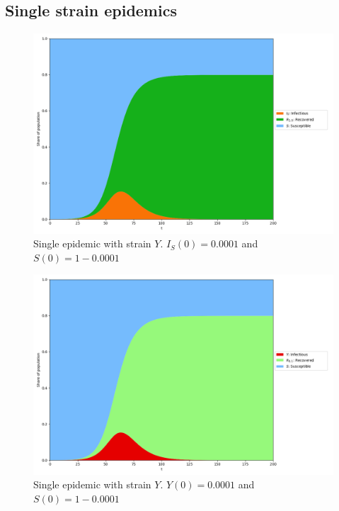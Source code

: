 \documentclass[10pt,a4paper]{article}
\begin{document}
\subsection{Single strain epidemics}
\begin{figure}[ht]\centering
    \includegraphics[width=0.9\linewidth]{../Figures/TwoStrainModel_OnlyI.png}
    \caption{Single epidemic with strain $Y$. $I_S(0)=0.0001$ and $S(0)=1-0.0001$}
\end{figure}
\begin{figure}[ht]\centering
    \includegraphics[width=0.9\linewidth]{../Figures/TwoStrainModel_OnlyY.png}
    \caption{Single epidemic with strain $Y$. $Y(0)=0.0001$ and $S(0)=1-0.0001$}
\end{figure}
 
\end{document}
